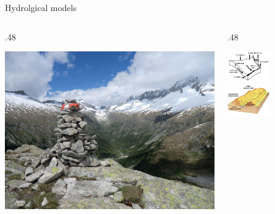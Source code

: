 \documentclass[ignorenonframetext,]{beamer}
\def\begincols{\begin{columns}}
\def\begincol{\begin{column}}
\def\endcol{\end{column}}
\def\endcols{\end{columns}}
\begin{document}
\begin{frame}{Hydrolgical models}

\begincols
 \begincol{.48\textwidth}

\includegraphics[width=1.00000\textwidth]{resources/images/valdifumo.jpg}~

\endcol
\begincol{.48\textwidth}

\includegraphics[width=0.50000\textwidth]{resources/images/versante1.png}\\
\includegraphics[width=0.50000\textwidth]{resources/images/versante2.png}\\
\endcol
\endcols

\end{frame}
\end{document}

